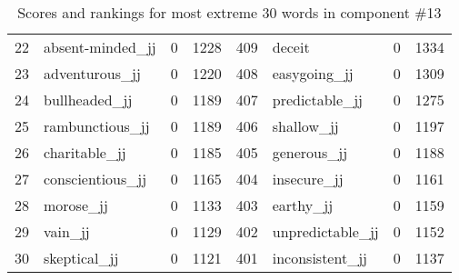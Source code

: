 \begin{table}[tbp]
\begin{tabular}{| rlr@{.}l | rlr@{.}l |}
    22 & absent-minded\_jj & 0 & 1228    &    409 & deceit & 0 & 1334 \\
    23 & adventurous\_jj & 0 & 1220    &    408 & easygoing\_jj & 0 & 1309 \\
    24 & bullheaded\_jj & 0 & 1189    &    407 & predictable\_jj & 0 & 1275 \\
    25 & rambunctious\_jj & 0 & 1189    &    406 & shallow\_jj & 0 & 1197 \\
    26 & charitable\_jj & 0 & 1185    &    405 & generous\_jj & 0 & 1188 \\
    27 & conscientious\_jj & 0 & 1165    &    404 & insecure\_jj & 0 & 1161 \\
    28 & morose\_jj & 0 & 1133    &    403 & earthy\_jj & 0 & 1159 \\
    29 & vain\_jj & 0 & 1129    &    402 & unpredictable\_jj & 0 & 1152 \\
    30 & skeptical\_jj & 0 & 1121    &    401 & inconsistent\_jj & 0 & 1137 \\
    \hline
    \end{tabular}
    \caption{Scores and rankings for most extreme 30 words in component \#13} 
\end{table}
\clearpage
